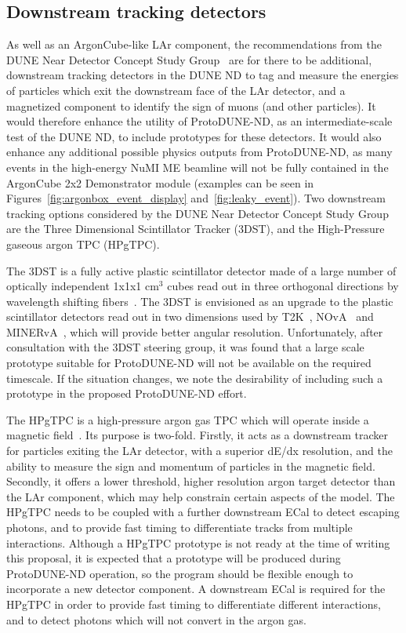 
\subsection{Downstream tracking detectors}
\label{sec:tracking_detectors}
As well as an ArgonCube-like LAr component, the recommendations from the DUNE Near Detector Concept Study Group~\cite{dune_ndcsg} are for there to be additional, downstream tracking detectors in the DUNE ND to tag and measure the energies of particles which exit the downstream face of the LAr detector, and a magnetized component to identify the sign of muons (and other particles). It would therefore enhance the utility of ProtoDUNE-ND, as an intermediate-scale test of the DUNE ND, to include prototypes for these detectors. It would also enhance any additional possible physics outputs from ProtoDUNE-ND, as many events in the high-energy NuMI ME beamline will not be fully contained in the ArgonCube 2x2 Demonstrator module (examples can be seen in Figures~\ref{fig:argonbox_event_display} and~\ref{fig:leaky_event}). Two downstream tracking options considered  by the DUNE Near Detector Concept Study Group are the Three Dimensional Scintillator Tracker (3DST), and the High-Pressure gaseous argon TPC (HPgTPC).

The 3DST is a fully active plastic scintillator detector made of a large number of optically independent 1x1x1 cm$^{3}$ cubes read out in three orthogonal directions by wavelength shifting fibers~\cite{3dst}. The 3DST is envisioned as an upgrade to the plastic scintillator detectors read out in two dimensions used by T2K~\cite{t2k-fgd,t2k-ingrid}, NOvA~\cite{nova} and MINERvA~\cite{minerva-nim}, which will provide better angular resolution. Unfortunately, after consultation with the 3DST steering group, it was found that a large scale prototype suitable for ProtoDUNE-ND will not be available on the required timescale. If the situation changes, we note the desirability of including such a prototype in the proposed ProtoDUNE-ND effort.

The HPgTPC is a high-pressure argon gas TPC which will operate inside a magnetic field~\cite{dune_ndcsg}. Its purpose is two-fold. Firstly, it acts as a downstream tracker for particles exiting the LAr detector, with a superior dE/dx resolution, and the ability to measure the sign and momentum of particles in the magnetic field. Secondly, it offers a lower threshold, higher resolution argon target detector than the LAr component, which may help constrain certain aspects of the model. The HPgTPC needs to be coupled with a further downstream ECal to detect escaping photons, and to provide fast timing to differentiate tracks from multiple interactions. Although a HPgTPC prototype is not ready at the time of writing this proposal, it is expected that a prototype will be produced during ProtoDUNE-ND operation, so the program should be flexible enough to incorporate a new detector component. A downstream ECal is required for the HPgTPC in order to provide fast timing to differentiate different interactions, and to detect photons which will not convert in the argon gas.

